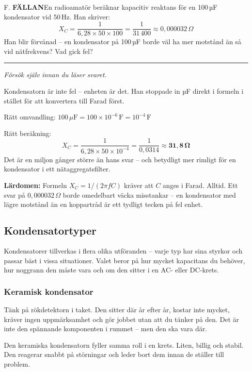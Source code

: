 \documentclass[a4paper,11pt,twoside]{book}
\newcommand{\emoji}[1]{{\emojifont #1}}
\newcommand{\qfallan}{\colorbox{ljusbrun}{\textcolor{kakao}{\headingfont\bfseries\tiny FÄLLAN}}}
\begin{document}
\begin{qblock}{F.}
\qfallan\quad En radioamatör beräknar kapacitiv reaktans för
en 100\,µF kondensator vid 50\,Hz. Han skriver:
\[
X_C = \frac{1}{6{,}28 \times 50 \times 100} = \frac{1}{31\,400} \approx 0{,}000032\,\Omega
\]
Han blir förvånad -- en kondensator på 100\,µF borde väl
ha mer motstånd än så vid nätfrekvens? Vad gick fel?
\end{qblock}

\medskip
\noindent\rule{\textwidth}{0.4pt}
{\small\itshape Försök själv innan du läser svaret.}
\medskip

\begin{worked}[title={Lösning -- Fallgropsfråga 1.4.2\,F}]
Kondensatorn är inte fel -- enheten är det. Han stoppade
in µF direkt i formeln i stället för att konvertera till
Farad först.

Rätt omvandling: $100\,\mu\text{F} = 100 \times 10^{-6}\,\text{F} = 10^{-4}\,\text{F}$

Rätt beräkning:
\[
X_C = \frac{1}{6{,}28 \times 50 \times 10^{-4}} = \frac{1}{0{,}0314} \approx \mathbf{31{,}8\,\Omega}
\]
Det är en miljon gånger större än hans svar -- och betydligt
mer rimligt för en kondensator i ett nätaggregatsfilter.

\textbf{Lärdomen:} Formeln $X_C = 1/(2\pi fC)$ kräver att
$C$ anges i Farad. Alltid. Ett svar på $0{,}000032\,\Omega$
borde omedelbart väcka misstankar -- en kondensator med
lägre motstånd än en koppartråd är ett tydligt tecken på
fel enhet.
\end{worked}


\subsection{Kondensatortyper}

Kondensatorer tillverkas i flera olika utföranden -- varje typ har sina styrkor och passar bäst i vissa situationer. Valet beror på hur mycket kapacitans du behöver, hur noggrann den måste vara och om den sitter i en AC- eller DC-krets.

\subsubsection*{Keramisk kondensator}

\begin{storybox}[{\emoji{☕} Alltid på plats}]
Tänk på rökdetektorn i taket. Den sitter där år efter år, 
kostar inte mycket, kräver ingen uppmärksamhet och gör 
jobbet utan att du tänker på den. Det är inte den 
spännande komponenten i rummet -- men den ska vara där.

Den keramiska kondensatorn fyller samma roll i en krets. 
Liten, billig och stabil. Den reagerar snabbt på 
störningar och leder bort dem innan de ställer till problem.
\end{storybox}
\end{document}
